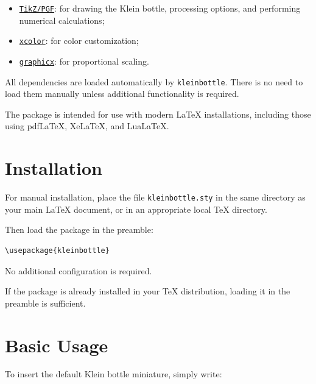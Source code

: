 \documentclass[12pt,a4paper]{article}
\begin{document}
\begin{itemize}

    \item \href{https://ctan.org/pkg/pgf}
        {\texttt{TikZ/PGF}}:
        for drawing the Klein bottle, processing
        options, and performing numerical calculations;

    \item \href{https://ctan.org/pkg/xcolor}
        {\texttt{xcolor}}:
        for color customization;

    \item \href{https://ctan.org/pkg/graphicx}
        {\texttt{graphicx}}:
        for proportional scaling.

\end{itemize}

All dependencies are loaded automatically by
\texttt{kleinbottle}. There is no need to load them
manually unless additional functionality is required.

The package is intended for use with modern
\LaTeX{} installations, including those using
pdf\LaTeX, Xe\LaTeX, and Lua\LaTeX.

\section{Installation}

For manual installation, place the file
\texttt{kleinbottle.sty} in the same directory as your
main \LaTeX{} document, or in an appropriate local
TeX directory.

Then load the package in the preamble:

\begin{verbatim}
\usepackage{kleinbottle}
\end{verbatim}

No additional configuration is required.

If the package is already installed in your TeX
distribution, loading it in the preamble is sufficient.

\section{Basic Usage}

To insert the default Klein bottle miniature, simply
write:
\end{document}

